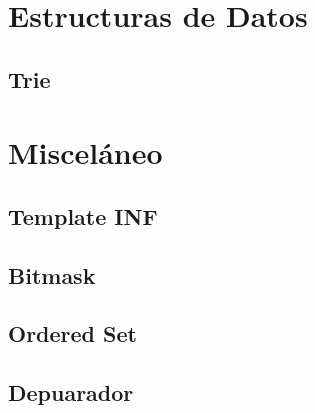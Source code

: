 \section{Estructuras de Datos}

\subsection{Trie}

\section{Misceláneo}

\subsection{Template INF}

\subsection{Bitmask}

\subsection{Ordered Set}

\subsection{Depuarador}



